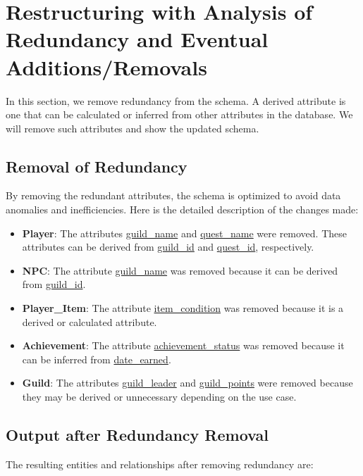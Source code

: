 \documentclass{article}
\begin{document}
\section{Restructuring with Analysis of Redundancy and Eventual Additions/Removals}
In this section, we remove redundancy from the schema. A derived attribute is one that can be calculated or inferred from other attributes in the database. We will remove such attributes and show the updated schema.

\subsection{Removal of Redundancy}
By removing the redundant attributes, the schema is optimized to avoid data anomalies and inefficiencies. Here is the detailed description of the changes made:

\begin{itemize}
    \item \textbf{Player}: The attributes \underline{guild\_name} and \underline{quest\_name} were removed. These attributes can be derived from \underline{guild\_id} and \underline{quest\_id}, respectively.
    \item \textbf{NPC}: The attribute \underline{guild\_name} was removed because it can be derived from \underline{guild\_id}.
    \item \textbf{Player\_Item}: The attribute \underline{item\_condition} was removed because it is a derived or calculated attribute.
    \item \textbf{Achievement}: The attribute \underline{achievement\_status} was removed because it can be inferred from \underline{date\_earned}.
    \item \textbf{Guild}: The attributes \underline{guild\_leader} and \underline{guild\_points} were removed because they may be derived or unnecessary depending on the use case.
\end{itemize}

\subsection{Output after Redundancy Removal}
The resulting entities and relationships after removing redundancy are:
\end{document}
